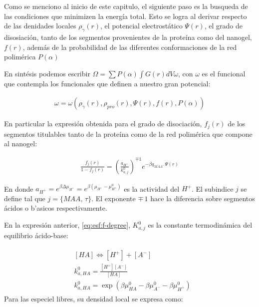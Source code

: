 Como se menciono al inicio de este capitulo, el siguiente paso es la busqueda de las condiciones que minimizen la energ\'ia total. Esto se logra al derivar respecto de las denidades locales $\rho_\gamma(r)$, el potencial electrost\'atico $\Psi(r)$, el grado de disosiaci\'on, tanto de los segmentos provenientes de la prote\'ina como del nanogel, $f(r)$, adem\'as de la probabilidad de las diferentes conformaciones de la red polim\'erica $P(\alpha)$

En sint\'esis podemos escribir $\Omega = \sum P(\alpha) \int{G(r) dV\omega}$,  con $\omega$ es el funcional que contempla los funcionales que definen a nuestro gran potencial: 

\begin{align}
	\omega=\omega(\rho_\gamma(r), \rho_{pro}(r),\Psi(r),f(r),P(\alpha))
	\label{eq:esf:funcionales-omega}
\end{align}


En particular la expresi\'on obtenida para el grado de disociaci\'on, $f_j(r)$ de los segmentos titulables tanto de la prote\'ina como de la red polim\'erica que compone al nanogel:

\begin{align}
	\frac{f_j(r)}{1-f_j(r)}= \left(\frac{a_{H^+}}{k^0_{a,j}}\right)^{\mp 1} e^{-\beta q_{MAA^-}\Psi(r)}
	\label{eq:esf:f-degree}
\end{align}

\noindent En donde  $a_{H^+}=e^{\beta\Delta\mu_{H^+}}=e^{\beta(\mu_{H^+} -\mu^0_{H^+})}$ es la actividad del $H^+$. El subindice  $j$ se define tal que  $j =\{MAA , \, \tau \}$. El exponente $\mp \, 1$ hace la diferencia sobre segmentos \'acidos o b'asicos respectivamente.

En la expresi\'on anterior, \ref{eq:esf:f-degree}, $K^0_{a,j}$ es la constante termodin\'amica del equilibrio \'acido-base:

\begin{align}
	\begin{aligned}
		& \left[HA\right] \Longleftrightarrow [H^+] +[A^-] \\
		& k_{a,HA}^0=\frac{[H^+][A^-]}{[HA]} \\
		& k_{a,HA}^0=\exp\left(\beta\mu_{HA}^0 - \beta \mu_{A^-}^0 - \beta \mu^0_{H^+} \right)
	\end{aligned}
	\label{eq:esf:dis-rxn}
\end{align}
Para las especiel libres, su densidad local se expresa como:



